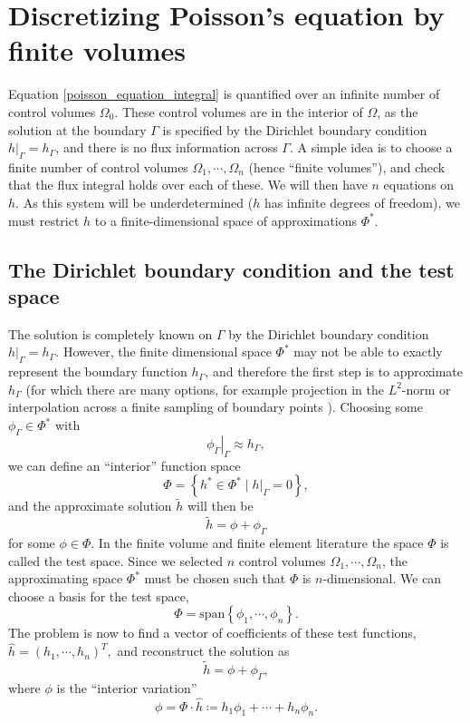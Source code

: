 \section{Discretizing Poisson's equation by finite volumes}\label{discretizing_poisson}

Equation \eqref{poisson_equation_integral} is quantified over an infinite number of control volumes $\Omega_0$.
These control volumes are in the interior of $\Omega$, as the solution at the boundary $\Gamma$ is specified by the Dirichlet boundary condition
$\left.h\right|_\Gamma = h_\Gamma$, and there is no flux information across $\Gamma$.
A simple idea is to choose a finite number of control volumes $\Omega_1,\cdots,\Omega_n$ (hence ``finite volumes''), and check that the flux integral holds over each of these.
We will then have $n$ equations on $h$. As this system will be underdetermined ($h$ has infinite degrees of freedom), we must
restrict $h$ to a finite-dimensional space of approximations $\Phi^*$.


\subsection{The Dirichlet boundary condition and the test space}
The solution is completely known on $\Gamma$ by the Dirichlet boundary condition $\left.h\right|_\Gamma = h_\Gamma$.
However, the finite dimensional space $\Phi^*$ may not be able to exactly represent the boundary function $h_\Gamma$,
and therefore the first step is to approximate $h_\Gamma$ (for which there are many options, for example
projection in the $L^2$-norm or interpolation across a finite sampling of boundary points \cite{approximation_theory}). Choosing some $\phi_\Gamma \in \Phi^*$ with
    $$\left.\phi_\Gamma\right|_\Gamma \approx h_\Gamma,$$
we can define an ``interior'' function space
$$
    \Phi = \left\{h^* \in \Phi^* \mid \left.h\right|_\Gamma = 0 \right\},
$$
and the approximate solution $\tilde{h}$ will then be
$$
    \tilde{h} = \phi + \phi_\Gamma
$$
for some $\phi \in \Phi$.
In the finite volume and finite element literature the space $\Phi$ is called the test space.
Since we selected $n$ control volumes $\Omega_1,\cdots,\Omega_n$, the approximating space $\Phi^*$ must be chosen such that
$\Phi$ is $n$-dimensional. We can choose a basis for the test space,
    $$\Phi = \text{span}\left\{\phi_1,\cdots,\phi_n\right\}.$$
The problem is now to find a vector of coefficients of these test functions,
    $\hat{h} = (h_1, \cdots, h_n)^T,$
and reconstruct the solution as
    $$\tilde{h} = \phi + \phi_\Gamma,$$
where $\phi$ is the ``interior variation''
    $$\phi = \Phi\cdot \hat{h} \coloneqq h_1\phi_1 + \cdots + h_n\phi_n.$$

